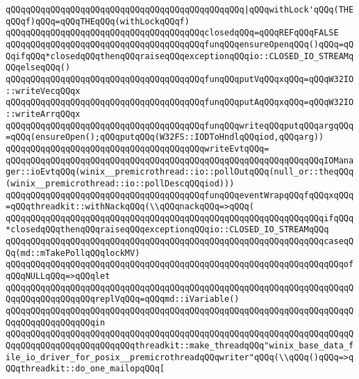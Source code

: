 \verb|qQQqqQQqqQQqqQQqqQQqqQQqqQQqqQQqqQQqqQQqqQQqqQQq|\verb#|qQQqwithLock'qQQq(THEqQQqf)qQQq=qQQqTHEqQQq(withLockqQQqf)#\newline
\verb|qQQqqQQqqQQqqQQqqQQqqQQqqQQqqQQqqQQqqQQqclosedqQQq=qQQqREFqQQqFALSE|\newline
\verb|qQQqqQQqqQQqqQQqqQQqqQQqqQQqqQQqqQQqqQQqfunqQQqensureOpenqQQq()qQQq=qQQqifqQQq*closedqQQqthenqQQqraiseqQQqexceptionqQQqio::CLOSED_IO_STREAMqQQqelseqQQq()|\newline
\verb|qQQqqQQqqQQqqQQqqQQqqQQqqQQqqQQqqQQqqQQqfunqQQqputVqQQqxqQQq=qQQqW32IO::writeVecqQQqx|\newline
\verb|qQQqqQQqqQQqqQQqqQQqqQQqqQQqqQQqqQQqqQQqfunqQQqputAqQQqxqQQq=qQQqW32IO::writeArrqQQqx|\newline
\verb|qQQqqQQqqQQqqQQqqQQqqQQqqQQqqQQqqQQqqQQqfunqQQqwriteqQQqputqQQqargqQQq=qQQq(ensureOpen();qQQqputqQQq(W32FS::IODToHndlqQQqiod,qQQqarg))|\newline
\verb|qQQqqQQqqQQqqQQqqQQqqQQqqQQqqQQqqQQqqQQqwriteEvtqQQq=|\newline
\verb|qQQqqQQqqQQqqQQqqQQqqQQqqQQqqQQqqQQqqQQqqQQqqQQqqQQqqQQqqQQqqQQqIOManager::ioEvtqQQq(winix__premicrothread::io::pollOutqQQq(null_or::theqQQq(winix__premicrothread::io::pollDescqQQqiod)))|\newline
\verb|qQQqqQQqqQQqqQQqqQQqqQQqqQQqqQQqqQQqqQQqfunqQQqeventWrapqQQqfqQQqxqQQq=qQQqthreadkit::withNackqQQq(\\qQQqnackqQQq=>qQQq(|\newline
\verb|qQQqqQQqqQQqqQQqqQQqqQQqqQQqqQQqqQQqqQQqqQQqqQQqqQQqqQQqqQQqqQQqifqQQq*closedqQQqthenqQQqraiseqQQqexceptionqQQqio::CLOSED_IO_STREAMqQQq|\newline
\verb|qQQqqQQqqQQqqQQqqQQqqQQqqQQqqQQqqQQqqQQqqQQqqQQqqQQqqQQqqQQqqQQqcaseqQQq(md::mTakePollqQQqlockMV)|\newline
\verb|qQQqqQQqqQQqqQQqqQQqqQQqqQQqqQQqqQQqqQQqqQQqqQQqqQQqqQQqqQQqqQQqqQQqofqQQqNULLqQQq=>qQQqlet|\newline
\verb|qQQqqQQqqQQqqQQqqQQqqQQqqQQqqQQqqQQqqQQqqQQqqQQqqQQqqQQqqQQqqQQqqQQqqQQqqQQqqQQqqQQqqQQqreplVqQQq=qQQqmd::iVariable()|\newline
\verb|qQQqqQQqqQQqqQQqqQQqqQQqqQQqqQQqqQQqqQQqqQQqqQQqqQQqqQQqqQQqqQQqqQQqqQQqqQQqqQQqqQQqqQQqin|\newline
\verb|qQQqqQQqqQQqqQQqqQQqqQQqqQQqqQQqqQQqqQQqqQQqqQQqqQQqqQQqqQQqqQQqqQQqqQQqqQQqqQQqqQQqqQQqqQQqqQQqthreadkit::make_threadqQQq"winix_base_data_file_io_driver_for_posix__premicrothreadqQQqwriter"qQQq(\\qQQq()qQQq=>qQQqthreadkit::do_one_mailopqQQq[|\newline
